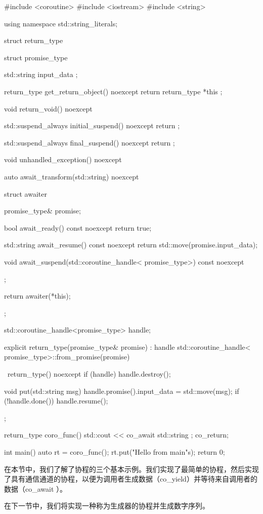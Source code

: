 \begin{cpp}
#include <coroutine>
#include <iostream>
#include <string>

using namespace std::string_literals;

struct return_type {
    struct promise_type {
        std::string input_data { };

        return_type get_return_object() noexcept {
            return return_type{ *this };
        }

        void return_void() noexcept {
        }

        std::suspend_always initial_suspend() noexcept {
            return {};
        }

        std::suspend_always final_suspend() noexcept {
            return {};
        }

        void unhandled_exception() noexcept {
        }

        auto await_transform(std::string) noexcept {
            struct awaiter {
                promise_type& promise;

                bool await_ready() const noexcept {
                    return true;
                }

                std::string await_resume() const noexcept {
                    return std::move(promise.input_data);
                }

                void await_suspend(std::coroutine_handle<
                                   promise_type>) const noexcept {
                }
            };

            return awaiter(*this);
        }
    };

    std::coroutine_handle<promise_type> handle{};

    explicit return_type(promise_type& promise)
        : handle{ std::coroutine_handle<
                            promise_type>::from_promise(promise)} {
    }

    ~return_type() noexcept {
        if (handle) {
            handle.destroy();
        }
    }

    void put(std::string msg) {
        handle.promise().input_data = std::move(msg);
        if (!handle.done()) {
            handle.resume();
        }
    }
};

return_type coro_func() {
    std::cout << co_await std::string{ };
    co_return;
}

int main() {
    auto rt = coro_func();
    rt.put("Hello from main\n"s);
    return 0;
}
\end{cpp}

在本节中，我们了解了协程的三个基本示例。我们实现了最简单的协程，然后实现了具有通信通道的协程，以便为调用者生成数据（co\_yield）并等待来自调用者的数据（co\_await ）。

在下一节中，我们将实现一种称为生成器的协程并生成数字序列。





